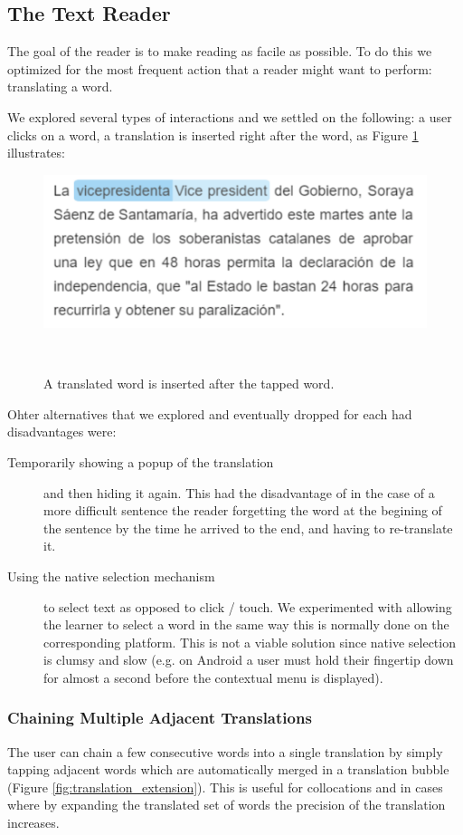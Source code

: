 \subsection{The Text Reader}

The goal of the reader is to make reading as facile as possible. To do this we optimized for the most frequent action that a reader might want to perform: translating a word. 

We explored several types of interactions and we settled on the following: a user clicks on a word, a translation is inserted right after the word, as Figure \ref{fig:translated_word} illustrates: 

\begin{figure}[h!]
\centering
  \includegraphics[width=0.8\columnwidth]{figures/translated_word}
  \caption{A translated word is inserted after the tapped word.}~\label{fig:translated_word}
\end{figure}

Ohter alternatives that we explored and eventually dropped for each had disadvantages were: 
\begin{description}

  \item [Temporarily showing a popup of the translation] and then hiding it again. This had the disadvantage of in the case of a more difficult sentence the reader forgetting the word at the begining of the sentence by the time he arrived to the end, and having to re-translate it. 

  \item [Using the native selection mechanism] to select text as opposed to click / touch. We experimented with allowing the learner to select a word in the same way this is normally done on the corresponding platform. This is not a viable solution since native selection is clumsy and slow (e.g. on Android a user must hold their fingertip down for almost a second before the contextual menu is displayed). 
\end{description}


\subsubsection{Chaining Multiple Adjacent Translations}
The user can chain a few consecutive words into a single translation by simply tapping adjacent words which are automatically merged in a translation bubble (Figure \ref{fig:translation_extension}). This is useful for collocations and in cases where by expanding the translated set of words the precision of the translation increases. 


